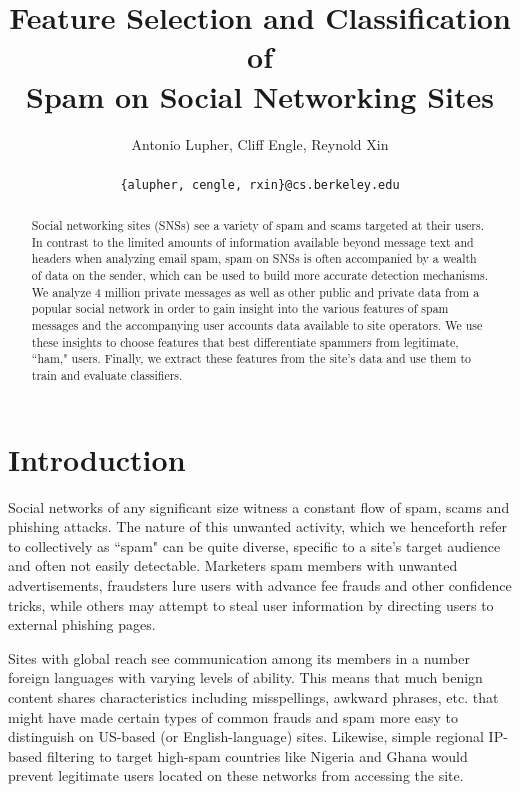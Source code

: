 \documentclass[preprint]{acm_proc_article-sp}
\begin{document}
\title{Feature Selection and Classification of \\
    Spam on Social Networking Sites}

\author{
Antonio Lupher,
Cliff Engle,
Reynold Xin\\\\
\texttt{\{alupher, cengle, rxin\}@cs.berkeley.edu}
}

\maketitle
\begin{abstract}
Social networking sites (SNSs) see a variety of spam and scams targeted at 
their users. In contrast to the limited amounts of information available beyond 
message text and headers when analyzing email spam, spam on SNSs is often accompanied 
by a wealth of data on the sender, which can be used to build more accurate detection mechanisms. 
We analyze 4 million private messages as well as other public and private data from 
a popular social network in order to gain insight into the various features of 
spam messages and the accompanying user accounts data available to site operators. 
We use these insights to choose features that best differentiate spammers from 
legitimate, ``ham," users.  Finally, we extract these features from the site's data 
and use them to train and evaluate classifiers.
\end{abstract}

\maketitle

\section{Introduction}

Social networks of any significant size witness a constant flow of spam, scams and phishing attacks. 
The nature of this unwanted activity, which we henceforth refer to collectively as ``spam" can be 
quite diverse, specific to a site's target audience and often not easily detectable. Marketers 
spam members with unwanted advertisements, fraudsters lure users with advance fee frauds and 
other confidence tricks, while others may attempt to steal user information by directing users 
to external phishing pages. 

Sites with global reach see communication among its members in a number foreign languages with 
varying levels of ability. This means that much benign content shares characteristics including 
misspellings, awkward phrases, etc. that might have made certain types of common frauds and spam 
more easy to distinguish on US-based (or English-language) sites. Likewise, simple regional IP-based 
filtering to target high-spam countries like Nigeria and Ghana would prevent legitimate users 
located on these networks from accessing the site.
\end{document}
